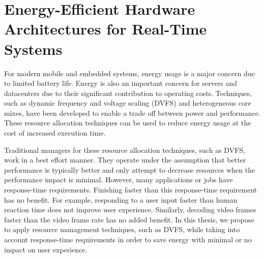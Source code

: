 \section{Energy-Efficient Hardware Architectures for Real-Time Systems}
\label{sec:intro.energy}

For modern mobile and embedded systems, energy usage is a major concern due to
limited battery life. Energy is also an important concern for servers and
datacenters due to their significant contribution to operating costs.
Techniques, such as dynamic frequency and voltage scaling (DVFS) and
heterogeneous core mixes, have been developed to enable a trade off between
power and performance. These resource allocation techniques can be used to
reduce energy usage at the cost of increased execution time.

Traditional managers for these resource allocation techniques, such as DVFS,
work in a best effort manner. They operate under the assumption that better
performance is typically better and only attempt to decrease resources when the
performance impact is minimal.  However, many applications or jobs have
response-time requirements.  Finishing faster than this response-time
requirement has no benefit. For example, responding to a user input faster than
human reaction time does not improve user experience. Similarly, decoding video
frames faster than the video frame rate has no added benefit. In this thesis,
we propose to apply resource management techniques, such as DVFS, while taking
into account response-time requirements in order to save energy with minimal or
no impact on user experience.

